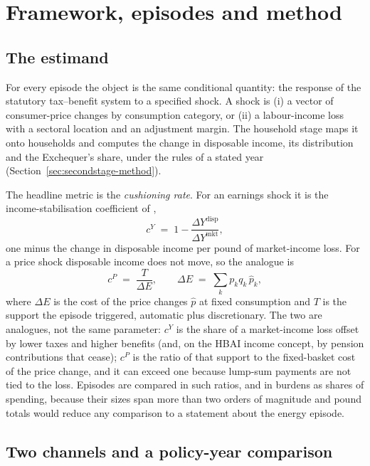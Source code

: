 \section{Framework, episodes and method}\label{sec:framework}

\subsection{The estimand}

For every episode the object is the same conditional quantity: the
response of the statutory tax--benefit system to a specified shock.
A shock is (i) a vector of consumer-price changes by consumption
category, or (ii) a labour-income loss with a sectoral location and an
adjustment margin. The household stage maps it onto households and
computes the change in disposable income, its distribution and the
Exchequer's share, under the rules of a stated year
(Section~\ref{sec:secondstage-method}).

The headline metric is the \emph{cushioning rate}. For an earnings
shock it is the income-stabilisation coefficient of \citet{dolls2012},
\begin{equation*}
c^{Y} \;=\; 1 - \frac{\Delta Y^{\text{disp}}}{\Delta Y^{\text{mkt}}},
\end{equation*}
one minus the change in disposable income per pound of market-income
loss. For a price shock disposable income does not move, so the
analogue is
\begin{equation*}
c^{P} \;=\; \frac{T}{\Delta E}, \qquad
\Delta E \;=\; \sum_{k} p_{k} q_{k}\,\hat{p}_{k},
\end{equation*}
where $\Delta E$ is the cost of the price changes $\hat{p}$ at fixed
consumption and $T$ is the support the episode triggered, automatic
plus discretionary. The two are analogues, not the same parameter:
$c^{Y}$ is the share of a market-income loss offset by lower taxes
and higher benefits (and, on the HBAI income concept, by pension
contributions that cease); $c^{P}$ is the ratio of that support to the
fixed-basket cost of the price change, and it can exceed one because
lump-sum payments are not tied to the loss. Episodes are compared in
such ratios, and in burdens as shares of spending, because their sizes
span more than two orders of magnitude and pound totals would reduce
any comparison to a statement about the energy episode.

\subsection{Two channels and a policy-year comparison}

